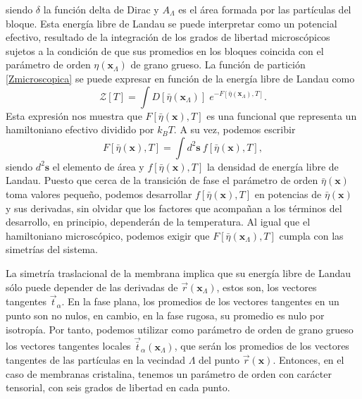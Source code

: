 siendo $\delta$ la función delta de Dirac y $A_{\Lambda}$ es el área
formada por las partículas del bloque. Esta energía libre de Landau se puede
interpretar como un potencial efectivo, resultado de la integración de los
grados de libertad microscópicos sujetos a la condición de que sus promedios
en los  bloques coincida con el parámetro de orden
$\eta(\mathbf{x}_{\Lambda})$ de grano grueso. La función de partición
\eqref{Zmicroscopica} se puede expresar en función de la energía libre de
Landau como
\begin{equation*}
\mathcal{Z}[T]=\int D[\bar{\eta}(\mathbf{x}_{\Lambda})]\; e^{-F[\bar{\eta}(\mathbf{x}_{\Lambda}),T]}.
\end{equation*}
Esta expresión nos muestra que $F[\bar{\eta}(\mathbf{x}),T]$ es una funcional
que representa un hamiltoniano efectivo dividido por $k_BT$. A su vez, podemos
escribir 
\begin{equation*}
F[\bar{\eta}(\mathbf{x}),T]=\int\! d^2\mathbf{s}\ f[\bar{\eta}(\mathbf{x}),T],
\end{equation*}
siendo $d^2\mathbf{s}$ el elemento de área y $f[\bar{\eta}(\mathbf{x}),T]$ la
densidad de energía libre de Landau. Puesto que cerca de la transición de fase
el parámetro de orden $\bar{\eta}(\mathbf{x})$ toma valores pequeño, podemos
desarrollar $f[\bar{\eta}(\mathbf{x}),T]$ en potencias de
$\bar{\eta}(\mathbf{x})$ y sus derivadas, sin olvidar que los factores que
acompañan a los términos del desarrollo, en principio, dependerán de la
temperatura. Al igual que el hamiltoniano microscópico, podemos exigir que
$F[\bar{\eta}(\mathbf{x}_{\Lambda}),T]$ cumpla con las simetrías del sistema.

La simetría traslacional de la membrana implica que su energía libre de Landau
sólo puede depender de las derivadas de $\vec{r}(\mathbf{x}_{\Lambda})$, estos
son, los vectores tangentes $\vec{t}_{\alpha}$. En la fase
plana, los promedios de los vectores tangentes en un punto son no nulos, en
cambio, en la fase rugosa, su promedio es nulo por isotropía. Por tanto,
podemos utilizar como  parámetro de orden de grano grueso los vectores
tangentes locales $\vec{\bar{t}}_{\alpha}(\mathbf{x}_{\Lambda})$, que serán
los promedios de los vectores tangentes de las partículas en la vecindad
$\Lambda$ del punto $\vec{r}(\mathbf{x})$. Entonces, en el caso de
membranas cristalina, tenemos un parámetro de orden con carácter tensorial,
con seis grados de libertad en cada punto.

